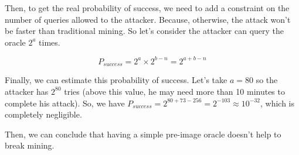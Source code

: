 Then, to get the real probability of success, we need to add a constraint on the number of queries allowed to the attacker. Because, otherwise, the attack won't be faster than traditional mining. So let's consider the attacker can query the oracle $2^a$ times.

\begin{equation}
P_{success} = 2^a \times 2^{b-n} = 2^{a + b - n}
\end{equation}
\newline

Finally, we can estimate this probability of success. Let's take $a = 80$ so the attacker has $2^{80}$ tries (above this value, he may need more than 10 minutes to complete his attack). So, we have $P_{success} = 2^{80+73-256} = 2^{-103} \approx 10^{-32}$, which is completely negligible.

Then, we can conclude that having a simple pre-image oracle doesn't help to break mining.
